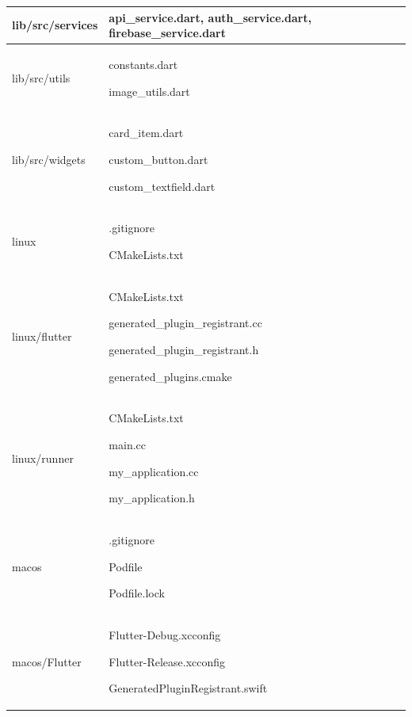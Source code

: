 \documentclass[conference]{IEEEtran}
\begin{document}
\begin{table}[h]
\begin{tabular}{|p{3.7cm}|p{4.1cm}|}
          lib/src/services \par   & \par api\_service.dart, auth\_service.dart, firebase\_service.dart 
        \\ \hline
        
        lib/src/utils  & \par constants.dart \par image\_utils.dart
        \\ \hline   

        lib/src/widgets  & \par card\_item.dart \par custom\_button.dart  \par custom\_textfield.dart
        \\ \hline 

        linux  & \par .gitignore \par CMakeLists.txt
        \\ \hline 

        linux/flutter   & \par CMakeLists.txt \par generated\_plugin\_registrant.cc \par generated\_plugin\_registrant.h \par generated\_plugins.cmake
        \\ \hline

        linux/runner \par   & \par CMakeLists.txt \par main.cc \par my\_application.cc \par my\_application.h
        \\ \hline

        macos \par   & \par .gitignore \par Podfile \par Podfile.lock
        \\ \hline

        macos/Flutter \par   & \par Flutter-Debug.xcconfig \par Flutter-Release.xcconfig \par GeneratedPluginRegistrant.swift
        \\ \hline


\end{tabular}
\end{table}
\end{document}
